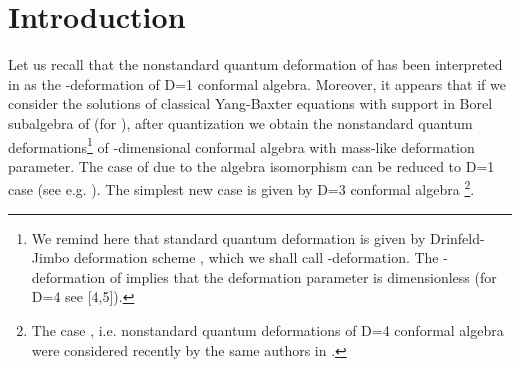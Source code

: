 \documentclass[a4paper,12pt,showkeys]{article}
\begin{document}
\section{Introduction}
\setcounter{page}{0}

Let us recall  that the nonstandard quantum deformation of
 \coordHE{} has been
  interpreted in
\cite{ll1}
   as the \myHighlight{$ \kappa$}\coordHE{}-deformation
 of D=1 conformal algebra. Moreover, it appears that if we consider the
 solutions of classical Yang-Baxter equations with support in Borel
 subalgebra  of
  \coordHE{} (for \coordHE{}), after quantization we obtain the nonstandard
  quantum deformations\footnote{We remind here that standard quantum
  deformation is given by Drinfeld-Jimbo deformation scheme
  \cite{ll2,ll3},
  which
   we shall call \coordHE{}-deformation. The \coordHE{}-deformation of \coordHE{}
   implies that the deformation parameter \coordHE{} is dimensionless
   (for D=4 see
   [4,5]).}
   of \coordHE{}-dimensional conformal algebra with mass-like
    deformation parameter.
   The \coordHE{} case of \coordHE{} due to the algebra isomorphism
\coordHE{} can be reduced to D=1 case
(see e.g.
 \cite{ll6}). The simplest new case is given by D=3 conformal
algebra
 \coordHE{}\footnote{The case \coordHE{}, i.e. nonstandard quantum
 deformations of D=4 conformal
algebra were considered recently by the same authors in
 \cite{ll7}.}.
\end{document}
